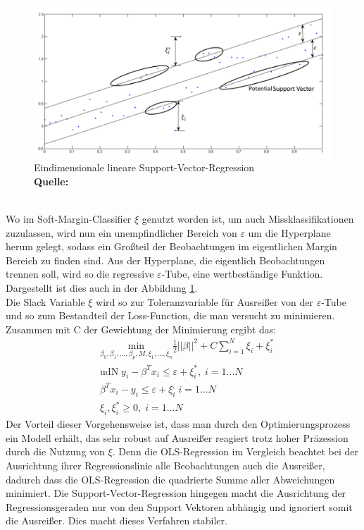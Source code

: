 \documentclass[a4paper,12pt]{thesis}
\newcommand*{\captionsource}[2]{%
	\caption[{#1}]{%
		#1%
		\\\hspace{\linewidth}%
		\textbf{Quelle:} #2%
	}%
}
\begin{document}
\begin{figure}[!ht]
	\centering
	\includegraphics[width=\textwidth]{Plots/SVM3.png}
	\captionsource{Eindimensionale lineare Support-Vector-Regression}{
		\cite{Awad2015}
	}
	\label{SVM3}
\end{figure}\\
Wo im Soft-Margin-Classifier $\xi$ genutzt worden ist, um auch Missklassifikationen zuzulassen, wird nun ein unempfindlicher Bereich von $\varepsilon$ um die Hyperplane herum gelegt, sodass ein Großteil der Beobachtungen im eigentlichen Margin Bereich zu finden sind. Aus der Hyperplane, die eigentlich Beobachtungen trennen soll, wird so die regressive $\varepsilon$-Tube, eine wertbeständige Funktion. Dargestellt ist dies auch in der Abbildung \ref{SVM3}.\\
Die Slack Variable $\xi$ wird so zur Toleranzvariable für Ausreißer von der $\varepsilon$-Tube und so zum Bestandteil der Loss-Function, die man versucht zu minimieren. Zusammen mit C der Gewichtung der Minimierung ergibt das:
\begin{equation}
	\label{SVM:Regression}
	\begin{aligned}
		&\underset{\beta_0, \beta_1, ... , \beta_p,M,\xi_1,...,\xi_n}{\text{min}}\frac{1}{2}||\beta||^2 + C\sum_{i=1}^N \xi_i + \xi_i^*\\
		&\text{udN}\; y_i - \beta^T x_i \leq \varepsilon + \xi_i^*, \; i=1...N\\
		&\beta^T x_i - y_i \leq \varepsilon + \xi_i^, \; i=1...N\\
		&\xi_i, \xi_i^* \geq 0, \; i=1...N
	\end{aligned} 
\end{equation}
Der Vorteil dieser Vorgehensweise ist, dass man durch den Optimierungsprozess ein Modell erhält, das sehr robust auf Ausreißer reagiert trotz hoher Präzession durch die Nutzung von $\xi$. Denn die OLS-Regression im Vergleich beachtet bei der Ausrichtung ihrer Regressionslinie alle Beobachtungen auch die Ausreißer, dadurch dass die OLS-Regression die quadrierte Summe aller Abweichungen minimiert. Die Support-Vector-Regression hingegen macht die Ausrichtung der Regressionsgeraden nur von den Support Vektoren abhängig und ignoriert somit die Ausreißer. Dies macht dieses Verfahren stabiler.
\end{document}
